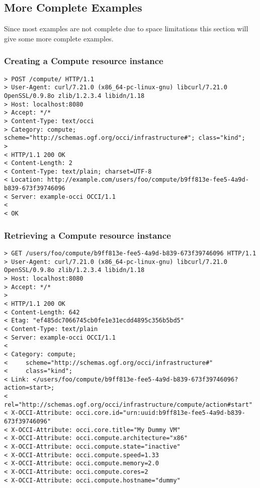 \documentclass[10pt,a4paper]{article}
\begin{document}
\subsection{More Complete Examples}
Since most examples are not complete due to space limitations this
section will give some more complete examples.

\subsubsection{Creating a Compute resource instance}
\begin{verbatim}
> POST /compute/ HTTP/1.1
> User-Agent: curl/7.21.0 (x86_64-pc-linux-gnu) libcurl/7.21.0 OpenSSL/0.9.8o zlib/1.2.3.4 libidn/1.18
> Host: localhost:8080
> Accept: */*
> Content-Type: text/occi
> Category: compute; scheme="http://schemas.ogf.org/occi/infrastructure#"; class="kind";
>
< HTTP/1.1 200 OK
< Content-Length: 2
< Content-Type: text/plain; charset=UTF-8
< Location: http://example.com/users/foo/compute/b9ff813e-fee5-4a9d-b839-673f39746096
< Server: example-occi OCCI/1.1
<
< OK
\end{verbatim}

\subsubsection{Retrieving a Compute resource instance}
\begin{verbatim}
> GET /users/foo/compute/b9ff813e-fee5-4a9d-b839-673f39746096 HTTP/1.1
> User-Agent: curl/7.21.0 (x86_64-pc-linux-gnu) libcurl/7.21.0 OpenSSL/0.9.8o zlib/1.2.3.4 libidn/1.18
> Host: localhost:8080
> Accept: */*
>
< HTTP/1.1 200 OK
< Content-Length: 642
< Etag: "ef485dc7066745cb0fe1e31ecdd4895c356b5bd5"
< Content-Type: text/plain
< Server: example-occi OCCI/1.1
<
< Category: compute;
<     scheme="http://schemas.ogf.org/occi/infrastructure#"
<     class="kind";
< Link: </users/foo/compute/b9ff813e-fee5-4a9d-b839-673f39746096?action=start>;
<     rel="http://schemas.ogf.org/occi/infrastructure/compute/action#start"
< X-OCCI-Attribute: occi.core.id="urn:uuid:b9ff813e-fee5-4a9d-b839-673f39746096"
< X-OCCI-Attribute: occi.core.title="My Dummy VM"
< X-OCCI-Attribute: occi.compute.architecture="x86"
< X-OCCI-Attribute: occi.compute.state="inactive"
< X-OCCI-Attribute: occi.compute.speed=1.33
< X-OCCI-Attribute: occi.compute.memory=2.0
< X-OCCI-Attribute: occi.compute.cores=2
< X-OCCI-Attribute: occi.compute.hostname="dummy"
\end{verbatim}
\end{document}
